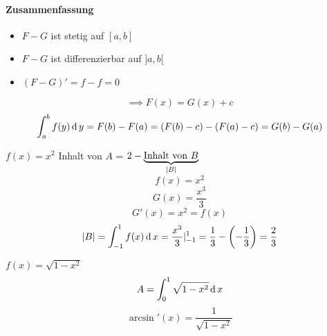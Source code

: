 \paragraph{Zusammenfassung}
\begin{itemize}
  \item $F-G$ ist stetig auf $[a,b]$
  \item $F-G$ ist differenzierbar auf $]a,b[$
  \item $(F-G)'=f-f=0$
\end{itemize}
\[\implies F(x)=G(x)+c\]
\[\int_a^bf(y)\operatorname{d} y=F(b)-F(a)=(F(b)-c)-(F(a)-c)=G(b)-G(a)\]
\begin{Bsp}
  $f(x)=x^2$
  Inhalt von $A$ = $2-\underbrace{\text{Inhalt von }B}_{ \mathopen|  B  \mathclose| }$
  \[f(x)=x^2\]
  \[G(x)=\frac{x^3}{3}\]
  \[G'(x)=x^2=f(x)\]
  \[\mathopen| B \mathclose|=\int_{-1}^1f(x)\operatorname{d} x=\frac{x^3}{3}|_{-1}^1=\frac{1}{3}-\left( -\frac{1}{3} \right)=\frac{2}{3}\]
\end{Bsp}
\begin{Bsp}
  $f(x)=\sqrt{1-x^2}$
  \[A=\int_0^1\sqrt{1-x^2}\operatorname{d} x\]
  \[\arcsin'(x)=\frac{1}{\sqrt{1-x^2}}\]
\end{Bsp}
